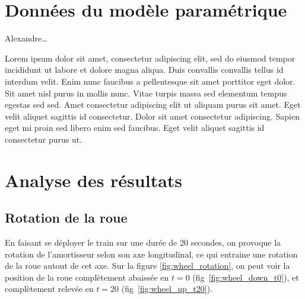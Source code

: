 \documentclass{article}
\begin{document}
\newpage
\tableofcontents

\newpage
\section{Données du modèle paramétrique}

Alexandre\dots

Lorem ipsum dolor sit amet, consectetur adipiscing elit, sed do eiusmod tempor incididunt ut labore et dolore magna aliqua. Duis convallis convallis tellus id interdum velit. Enim nunc faucibus a pellentesque sit amet porttitor eget dolor. Sit amet nisl purus in mollis nunc. Vitae turpis massa sed elementum tempus egestas sed sed. Amet consectetur adipiscing elit ut aliquam purus sit amet. Eget velit aliquet sagittis id consectetur. Dolor sit amet consectetur adipiscing. Sapien eget mi proin sed libero enim sed faucibus. Eget velit aliquet sagittis id consectetur purus ut.

\section{Analyse des résultats}
\subsection{Rotation de la roue}

En faisant se déployer le train sur une durée de 20 secondes, on provoque la rotation de l'amortisseur selon son axe longitudinal, ce qui entraine une rotation de la roue autout de cet axe. Sur la figure \ref{fig:wheel_rotation}, on peut voir la position de la roue complètement abaissée en \(t = 0\) (fig~\ref{fig:wheel_down_t0}), et complètement relevée en \(t=20\) (fig~\ref{fig:wheel_up_t20}).
\end{document}

